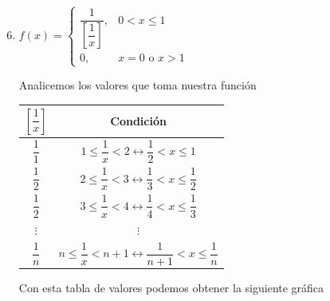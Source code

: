 \documentclass{report}
\begin{document}
\begin{enumerate}
\begin{enumerate}
                \setcounter{enumii}{5}
                \item $f(x) = \begin{cases}
                    \dfrac{1}{\left[\dfrac{1}{x}\right]}, & 0 < x \leq 1\\
                    0, & x=0 \text{ o } x > 1
                \end{cases}$

                Analicemos los valores que toma nuestra función

                \begin{table}[H]
                    \setlength{\extrarowheight}{20pt}
                    \centering
                    \begin{adjustbox}{valign=c}
                    \begin{tabular}{|c|c|}
                        \hline
                        $\left[\dfrac{1}{x}\right]$ & Condición                           \\ \hline
                        $\dfrac{1}{1}$              & $1 \leq \dfrac{1}{x} < 2 \leftrightarrow \dfrac{1}{2} < x \leq 1$               \\ \hline
                        $\dfrac{1}{2}$              & $2 \leq \dfrac{1}{x} < 3 \leftrightarrow \dfrac{1}{3} < x \leq \dfrac{1}{2}$     \\ \hline
                        $\dfrac{1}{2}$              & $3 \leq \dfrac{1}{x} < 4 \leftrightarrow \dfrac{1}{4} < x \leq \dfrac{1}{3}$     \\ \hline
                        $\vdots$                    & $\vdots$                                                                       \\ \hline
                        $\dfrac{1}{n}$                & $n \leq \dfrac{1}{x} < n+1 \leftrightarrow \dfrac{1}{n+1} < x \leq \dfrac{1}{n}$ \\ \hline
                    \end{tabular}
                \end{adjustbox}
                \end{table}

                Con esta tabla de valores podemos obtener la siguiente gráfica\\
                \begin{center}
                \end{center}


\end{enumerate}
\end{enumerate}
\end{document}
